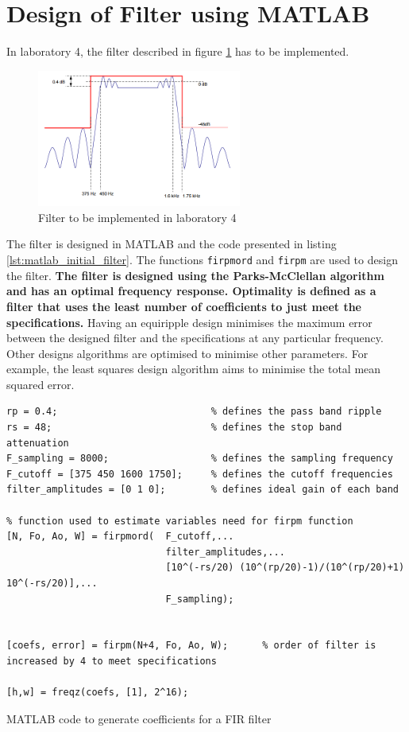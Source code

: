 \documentclass{article}
\begin{document}
\newpage
\section{Design of Filter using MATLAB}\label{sec:mat_design}
In laboratory 4, the filter described in figure \ref{fig:ideal_filter} has to be implemented.

\begin{figure}[H]
    \centering
    \includegraphics[width=0.6\textwidth]{ideal_filter}
    \caption{Filter to be implemented in laboratory 4}
    \label{fig:ideal_filter}
\end{figure}

The filter is designed in MATLAB and the code presented in listing \ref{lst:matlab_initial_filter}. The functions {\tt firpmord} and {\tt firpm} are used to design the filter. \textbf{The filter is designed using the Parks-McClellan algorithm and has an optimal frequency response. Optimality is defined as a filter that uses the least number of coefficients to just meet the specifications.} Having an equiripple design minimises the maximum error between the designed filter and the specifications at any particular frequency. Other designs algorithms are optimised to minimise other parameters. For example, the least squares design algorithm aims to minimise the total mean squared error.\\ 

\begin{listing}
\begin{verbatim}
rp = 0.4;                           % defines the pass band ripple
rs = 48;                            % defines the stop band attenuation
F_sampling = 8000;                  % defines the sampling frequency
F_cutoff = [375 450 1600 1750];     % defines the cutoff frequencies
filter_amplitudes = [0 1 0];        % defines ideal gain of each band

% function used to estimate variables need for firpm function
[N, Fo, Ao, W] = firpmord(  F_cutoff,...
                            filter_amplitudes,...
                            [10^(-rs/20) (10^(rp/20)-1)/(10^(rp/20)+1) 10^(-rs/20)],...
                            F_sampling);

                        
[coefs, error] = firpm(N+4, Fo, Ao, W);      % order of filter is increased by 4 to meet specifications

[h,w] = freqz(coefs, [1], 2^16);
\end{verbatim}
\caption{MATLAB code to generate coefficients for a FIR filter} 
\label{lst:matlab_initial_filter}
\end{listing}
\end{document}
